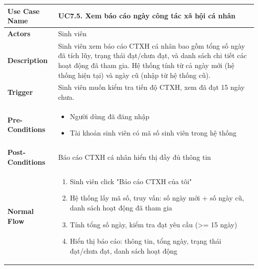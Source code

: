     \newpage
    \begin{table}[H]
    \renewcommand{\arraystretch}{1.3}
    \begin{tabular}{|m{}|m{}|}
    \hline
    \textbf{Use Case Name} 
    & \textbf{UC7.5. Xem báo cáo ngày công tác xã hội cá nhân} \\ \hline

\textbf{Actors} 
& Sinh viên \\ \hline

\textbf{Description}
    & Sinh viên xem báo cáo CTXH cá nhân bao gồm tổng số ngày đã tích lũy, trạng thái đạt/chưa đạt, và danh sách chi tiết các hoạt động đã tham gia. Hệ thống tính từ cả ngày mới (hệ thống hiện tại) và ngày cũ (nhập từ hệ thống cũ).
    \\ \hline

    \textbf{Trigger} 
    & Sinh viên muốn kiểm tra tiến độ CTXH, xem đã đạt 15 ngày chưa.
    \\ \hline

    \textbf{Pre-Conditions} 
    & \begin{itemize}
        \item Người dùng đã đăng nhập
        \item Tài khoản sinh viên có mã số sinh viên trong hệ thống
    \end{itemize}
    \\ \hline

    \textbf{Post-Conditions} 
    & Báo cáo CTXH cá nhân hiển thị đầy đủ thông tin
    \\ \hline

    \textbf{Normal Flow} 
    & 
    \begin{enumerate}
        \item Sinh viên click "Báo cáo CTXH của tôi"
        \item Hệ thống lấy mã số, truy vấn: số ngày mới + số ngày cũ, danh sách hoạt động đã tham gia
        \item Tính tổng số ngày, kiểm tra đạt yêu cầu (>= 15 ngày)
        \item Hiển thị báo cáo: thông tin, tổng ngày, trạng thái đạt/chưa đạt, danh sách hoạt động
    \end{enumerate}
    \\ \hline


\end{tabular}
\end{table}
